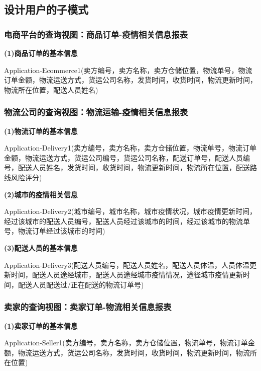 \documentclass[12pt]{article}
\begin{document}
\subsection{设计用户的子模式}

\subsubsection{电商平台的查询视图：商品订单-疫情相关信息报表}

\noindent \textbf{(1)商品订单的基本信息} \par 
\noindent Application-Ecommerce1(卖方编号，卖方名称，卖方仓储位置，物流单号，物流订单金额，物流运送方式，货运公司名称，发货时间，收货时间，物流更新时间，物流所在位置，配送人员姓名)

\subsubsection{物流公司的查询视图：物流运输-疫情相关信息报表}

\noindent \textbf{(1)物流订单的基本信息} \par 
\noindent Application-Delivery1(卖方编号，卖方名称，卖方仓储位置，物流单号，物流订单金额，物流运送方式，货运公司编号，货运公司名称，配送订单号，配送人员编号，配送人员姓名，发货时间，收货时间，物流更新时间，物流所在位置，配送路线风险评分)

\vspace{0.3cm}
\noindent \textbf{(2)城市的疫情相关信息} \par 
\noindent Application-Delivery2(城市编号，城市名称，城市疫情状况，城市疫情更新时间，经过该城市的配送人员编号，配送人员经过该城市的时间，经过该城市的物流单号，物流订单经过该城市的时间)

\vspace{0.3cm}
\noindent \textbf{(3)配送人员的基本信息} \par 
\noindent Application-Delivery3(配送人员编号，配送人员姓名，配送人员体温，人员体温更新时间，配送人员途经城市，配送人员途经城市疫情情况，途径城市疫情更新时间，配送人员配送过/正在配送的物流订单号)

\subsubsection{卖家的查询视图：卖家订单-物流相关信息报表}

\noindent \textbf{(1)卖家订单的基本信息} \par 
\noindent Application-Seller1(卖方编号，卖方名称，卖方仓储位置，物流单号，物流订单金额，物流运送方式，货运公司名称，发货时间，收货时间，物流更新时间，物流所在位置)
\end{document}
